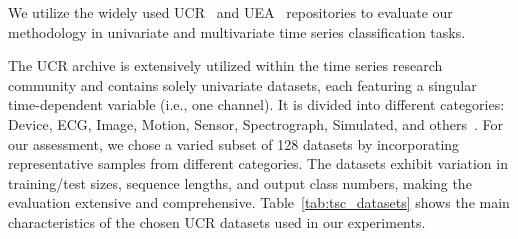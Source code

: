 We utilize the widely used UCR~\cite{UCRArchive2018} and UEA~\cite{bagnall2018ueamultivariatetimeseries} repositories to evaluate our methodology in univariate and multivariate time series classification tasks.

The UCR archive is extensively utilized within the time series research community and contains solely univariate datasets, each featuring a singular time-dependent variable (i.e., one channel). It is divided into different categories: Device, ECG, Image, Motion, Sensor, Spectrograph, Simulated, and others~\cite{UCRArchive2018}. For our assessment, we chose a varied subset of 128 datasets by incorporating representative samples from different categories. The datasets exhibit variation in training/test sizes, sequence lengths, and output class numbers, making the evaluation extensive and comprehensive. Table~\ref{tab:tsc_datasets} shows the main characteristics of the chosen UCR datasets used in our experiments.




